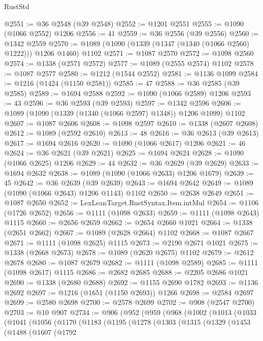 \begin{lexlean}{RustStd}
\begin{coremodule}
@2551 := @36 @2548 (@39 @2548)
@2552 := @1201 @2551
@2555 := @1090 (@1066 @2552) @1206
@2556 := 41
@2559 := @36 @2556 (@39 @2556)
@2560 := @1342 @2559
@2570 := @1089 (@1090 (@1339 (@1347 (@1340 (@1066 @2560) @1222))) @1206 @1460) @1102
@2571 := @1087 @2570
@2572 := @1098 @2560
@2574 := @1338 (@2571 @2572)
@2577 := @1089 (@2555 @2574) @1102
@2578 := @1087 @2577
@2580 := @1212 (@1544 @2552)
@2581 := @1136 @1099
@2584 := @1216 (@1424 (@1150 @2581))
@2585 := 47
@2588 := @36 @2585 (@39 @2585)
@2589 := @1694 @2588
@2592 := @1090 (@1066 @2589) @1206
@2593 := 43
@2596 := @36 @2593 (@39 @2593)
@2597 := @1342 @2596
@2606 := @1089 (@1090 (@1339 (@1340 (@1066 @2597) @1348)) @1206 @1099) @1102
@2607 := @1087 @2606
@2608 := @1098 @2597
@2610 := @1338 (@2607 @2608)
@2612 := @1089 (@2592 @2610)
@2613 := 48
@2616 := @36 @2613 (@39 @2613)
@2617 := @1694 @2616
@2620 := @1090 (@1066 @2617) @1206
@2621 := 46
@2624 := @36 @2621 (@39 @2621)
@2625 := @1694 @2624
@2628 := @1090 (@1066 @2625) @1206
@2629 := 44
@2632 := @36 @2629 (@39 @2629)
@2633 := @1694 @2632
@2638 := @1089 (@1090 (@1066 @2633) @1206 @1679)
@2639 := 45
@2642 := @36 @2639 (@39 @2639)
@2643 := @1694 @2642
@2649 := @1089 (@1090 (@1066 @2643) @1206 @1143) @1102
@2650 := @2638 @2649
@2651 := @1087 @2650
@2652 := LexLeanTarget.RustSyntax.Item.intMul
@2654 := @1106 (@1726 @2652)
@2656 := @1111 (@1098 @2633)
@2659 := @1111 (@1098 @2643) @1115
@2660 := @2656 @2659
@2662 := @2654 @2660 @1021
@2664 := @1338 (@2651 @2662)
@2667 := @1089 (@2628 @2664) @1102
@2668 := @1087 @2667
@2671 := @1111 (@1098 @2625) @1115
@2673 := @2190 @2671 @1021
@2675 := @1338 (@2668 @2673)
@2678 := @1089 (@2620 @2675) @1102
@2679 := @2612 @2678
@2680 := @1087 @2679
@2682 := @1111 (@1098 @2589)
@2685 := @1111 (@1098 @2617) @1115
@2686 := @2682 @2685
@2688 := @2205 @2686 @1021
@2690 := @1338 (@2680 @2688)
@2692 := @1155 @2690 @1782
@2693 := @1136 @2692
@2697 := @1216 (@1651 (@1150 @2693)) @1266
@2698 := @2584 @2697
@2699 := @2580 @2698
@2700 := @2578 @2699
@2702 := @908 (@2547 @2700)
@2703 := @10 @907
@2734 := @906
    (@952
      (@959
        (@968
          (@1002
            (@1013
              (@1033
                (@1041
                  (@1056
                    (@1170
                      (@1183
                        (@1195
                          (@1278
                            (@1303
                              (@1315
                                (@1329
                                  (@1453
                                    (@1488
                                      (@1607
                                        (@1792

\end{coremodule}
\end{lexlean}
